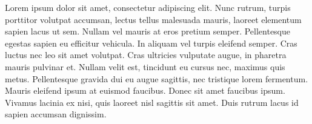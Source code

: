 \documentclass[main_article.tex]{subfiles}
\begin{document}
Lorem ipsum dolor sit amet, consectetur adipiscing elit. Nunc rutrum, turpis porttitor volutpat accumsan, lectus tellus malesuada mauris, laoreet elementum sapien lacus ut sem. Nullam vel mauris at eros pretium semper. Pellentesque egestas sapien eu efficitur vehicula. In aliquam vel turpis eleifend semper. Cras luctus nec leo sit amet volutpat. Cras ultricies vulputate augue, in pharetra mauris pulvinar et. Nullam velit est, tincidunt eu cursus nec, maximus quis metus. Pellentesque gravida dui eu augue sagittis, nec tristique lorem fermentum. Mauris eleifend ipsum at euismod faucibus. Donec sit amet faucibus ipsum. Vivamus lacinia ex nisi, quis laoreet nisl sagittis sit amet. Duis rutrum lacus id sapien accumsan dignissim. 
\end{document}
